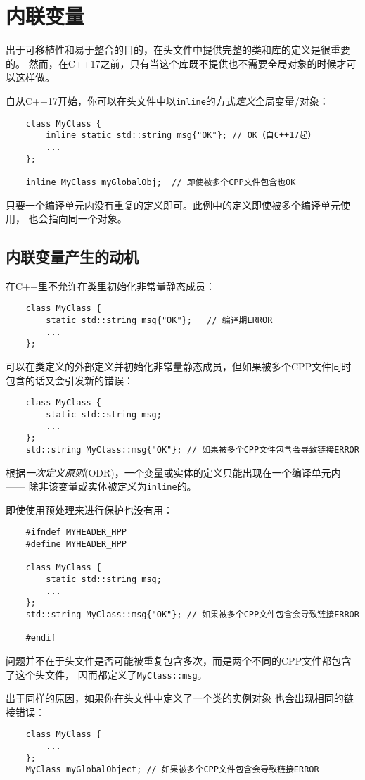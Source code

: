 \chapter{内联变量}\label{ch3}
出于可移植性和易于整合的目的，在头文件中提供完整的类和库的定义是很重要的。
然而，在C++17之前，只有当这个库既不提供也不需要全局对象的时候才可以这样做。

自从C++17开始，你可以在头文件中以\texttt{inline}的方式\emph{定义}全局变量/对象：
\begin{lstlisting}
    class MyClass {
        inline static std::string msg{"OK"}; // OK（自C++17起）
        ...
    };

    inline MyClass myGlobalObj;  // 即使被多个CPP文件包含也OK
\end{lstlisting}
只要一个编译单元内没有重复的定义即可。此例中的定义即使被多个编译单元使用，
也会指向同一个对象。

\section{内联变量产生的动机}
在C++里不允许在类里初始化非常量静态成员：
\begin{lstlisting}
    class MyClass {
        static std::string msg{"OK"};   // 编译期ERROR
        ...
    };
\end{lstlisting}
可以在类定义的外部定义并初始化非常量静态成员，但如果被多个CPP文件同时包含的话又会引发新的错误：
\begin{lstlisting}
    class MyClass {
        static std::string msg;
        ...
    };
    std::string MyClass::msg{"OK"}; // 如果被多个CPP文件包含会导致链接ERROR
\end{lstlisting}
根据\emph{一次定义原则}(ODR)，一个变量或实体的定义只能出现在一个编译单元内——
除非该变量或实体被定义为\texttt{inline}的。

即使使用预处理来进行保护也没有用：
\begin{lstlisting}
    #ifndef MYHEADER_HPP
    #define MYHEADER_HPP

    class MyClass {
        static std::string msg;
        ...
    };
    std::string MyClass::msg{"OK"}; // 如果被多个CPP文件包含会导致链接ERROR

    #endif
\end{lstlisting}
问题并不在于头文件是否可能被重复包含多次，而是两个不同的CPP文件都包含了这个头文件，
因而都定义了\texttt{MyClass::msg}。

出于同样的原因，如果你在头文件中定义了一个类的实例对象
也会出现相同的链接错误：
\begin{lstlisting}
    class MyClass {
        ...
    };
    MyClass myGlobalObject; // 如果被多个CPP文件包含会导致链接ERROR
\end{lstlisting}

